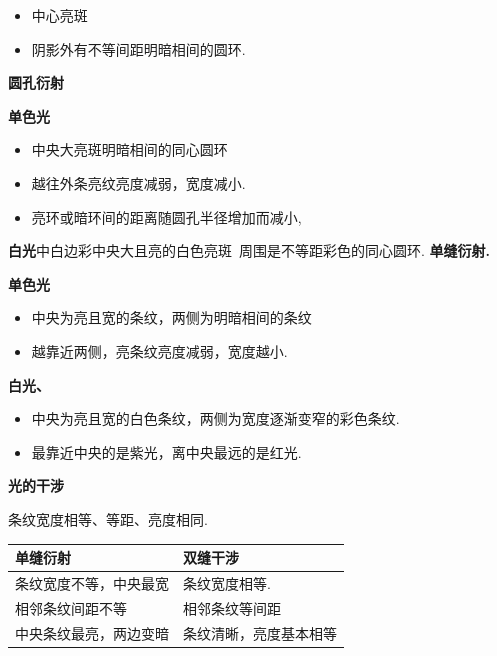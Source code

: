 \begin{itemize}
\item 中心亮斑
\item 阴影外有不等间距明暗相间的圆环. %
\end{itemize}
\textbf{圆孔衍射}


\textbf{单色光}
\begin{itemize}
\item 中央大亮斑\quad 明暗相间的同心圆环
\item 越往外\quad 条亮纹亮度减弱，宽度减小. %
\item 亮环或暗环间的距离随圆孔半径增加而减小,
\end{itemize}

\textbf{白光}\quad 中白边彩\quad 中央大且亮的白色亮斑\ 周围是不等距彩色的同心圆环.
\textbf{单缝衍射.}


\textbf{单色光}
\begin{itemize}
\item 中央为亮且宽的条纹，两侧为明暗相间的条纹
\item 越靠近两侧，亮条纹亮度减弱，宽度越小.
\end{itemize}

\textbf{白光、}
\begin{itemize}
\item 中央为亮且宽的白色条纹，两侧为宽度逐渐变窄的彩色条纹.
\item 最靠近中央的是紫光，离中央最远的是红光.
\end{itemize}
\textbf{光的干涉}


条纹宽度相等、等距、亮度相同.
\begin{center}
\begin{tabular}{ll}
\toprule
单缝衍射 & 双缝干涉 \\
\midrule
条纹宽度不等，中央最宽 & 条纹宽度相等. \\
相邻条纹间距不等 & 相邻条纹等间距 \\
中央条纹最亮，两边变暗 & 条纹清晰，亮度基本相等 \\
\bottomrule
\end{tabular}
\end{center}


